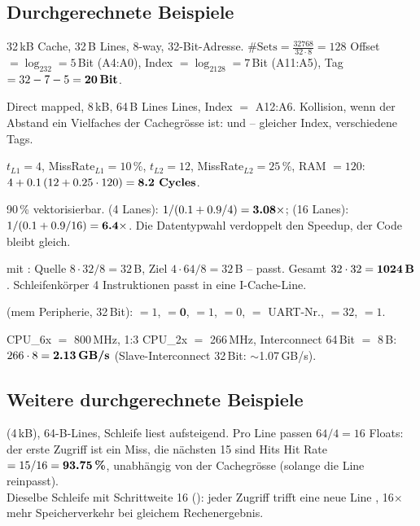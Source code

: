 \subsection{Durchgerechnete Beispiele}
\begin{bsp}
 32\,kB Cache, 32\,B Lines, 8-way, 32-Bit-Adresse.
$\#\text{Sets}=\frac{32768}{32\cdot8}=128$ \ra Offset $=\log_232=5$\,Bit
(A4:A0), Index $=\log_2128=7$\,Bit (A11:A5), Tag $=32-7-5=\textbf{20\,Bit}$.

 Direct mapped, 8\,kB, 64\,B Lines
 Lines, Index $=$ A12:A6. Kollision, wenn der Abstand ein
Vielfaches der Cachegrösse ist:  und  -- gleicher
Index, verschiedene Tags.

 $t_{L1}=4$, MissRate$_{L1}=10\,\%$, $t_{L2}=12$,
MissRate$_{L2}=25\,\%$, RAM $=120$:
$4+0.1\,(12+0.25\cdot120)=\textbf{8.2 Cycles}$.

 90\,\% vektorisierbar.
 (4 Lanes): $1/(0.1+0.9/4)=\textbf{3.08}\times$;
 (16 Lanes): $1/(0.1+0.9/16)=\textbf{6.4}\times$.
\ra Die Datentypwahl verdoppelt den Speedup, der Code bleibt gleich.

  mit : Quelle
$8\cdot32/8=32$\,B, Ziel $4\cdot64/8=32$\,B -- passt. Gesamt
$32\cdot32=\textbf{1024\,B}$. Schleifenkörper 4 Instruktionen \ra passt in
eine I-Cache-Line.

 (mem\,\ra\,Peripherie, 32\,Bit):
$=1$, $=\mathbf{0}$, $=1$,
$=0$, $=$ UART-Nr., $=32$, $=1$.

 CPU\_6x $=$ 800\,MHz, 1:3 \ra CPU\_2x $=$
266\,MHz, Interconnect 64\,Bit $=$ 8\,B: $266\cdot8=\textbf{2.13\,GB/s}$
(Slave-Interconnect 32\,Bit: $\sim$1.07\,GB/s).
\end{bsp}

\subsection{Weitere durchgerechnete Beispiele}
\begin{bsp}
 (4\,kB), 64-B-Lines, Schleife liest 
aufsteigend. Pro Line passen $64/4 = 16$ Floats: der erste Zugriff ist
ein Miss, die nächsten 15 sind Hits \ra Hit Rate $=15/16 = \textbf{93.75\,\%}$,
unabhängig von der Cachegrösse (solange die Line reinpasst).\\
Dieselbe Schleife mit Schrittweite 16 (): jeder Zugriff
trifft eine neue Line \ra {}, 16$\times$ mehr
Speicherverkehr bei gleichem Rechenergebnis.
\end{bsp}

